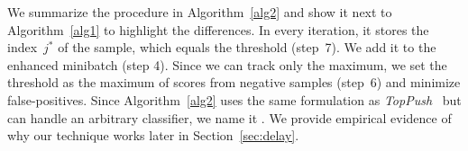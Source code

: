 We summarize the procedure in Algorithm~\ref{alg2} and show it next to Algorithm~\ref{alg1} to highlight the differences. In every iteration, it stores the index~$j^*$ of the sample, which equals the threshold (step~7). We add it to the enhanced minibatch (step 4). Since we can track only the maximum, we set the threshold as the maximum of scores from negative samples (step~6) and minimize false-positives. Since Algorithm~\ref{alg2} uses the same formulation as \textit{TopPush}~\cite{li2014top} but can handle an arbitrary classifier, we name it \DeepTopPush. We provide empirical evidence of why our technique works later in Section~\ref{sec:delay}.
